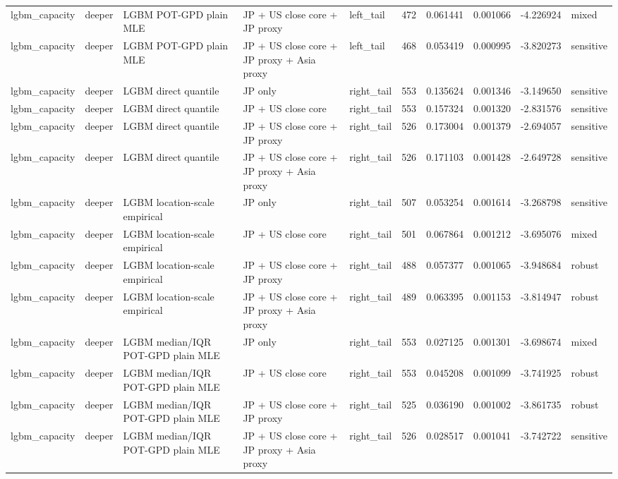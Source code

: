 \begin{tabular}{lll l lrrrrl}
lgbm\_capacity & deeper & LGBM POT-GPD plain MLE & JP + US close core + JP proxy & left\_tail & 472 & 0.061441 & 0.001066 & -4.226924 & mixed \\
lgbm\_capacity & deeper & LGBM POT-GPD plain MLE & JP + US close core + JP proxy + Asia proxy & left\_tail & 468 & 0.053419 & 0.000995 & -3.820273 & sensitive \\
lgbm\_capacity & deeper & LGBM direct quantile & JP only & right\_tail & 553 & 0.135624 & 0.001346 & -3.149650 & sensitive \\
lgbm\_capacity & deeper & LGBM direct quantile & JP + US close core & right\_tail & 553 & 0.157324 & 0.001320 & -2.831576 & sensitive \\
lgbm\_capacity & deeper & LGBM direct quantile & JP + US close core + JP proxy & right\_tail & 526 & 0.173004 & 0.001379 & -2.694057 & sensitive \\
lgbm\_capacity & deeper & LGBM direct quantile & JP + US close core + JP proxy + Asia proxy & right\_tail & 526 & 0.171103 & 0.001428 & -2.649728 & sensitive \\
lgbm\_capacity & deeper & LGBM location-scale empirical & JP only & right\_tail & 507 & 0.053254 & 0.001614 & -3.268798 & sensitive \\
lgbm\_capacity & deeper & LGBM location-scale empirical & JP + US close core & right\_tail & 501 & 0.067864 & 0.001212 & -3.695076 & mixed \\
lgbm\_capacity & deeper & LGBM location-scale empirical & JP + US close core + JP proxy & right\_tail & 488 & 0.057377 & 0.001065 & -3.948684 & robust \\
lgbm\_capacity & deeper & LGBM location-scale empirical & JP + US close core + JP proxy + Asia proxy & right\_tail & 489 & 0.063395 & 0.001153 & -3.814947 & robust \\
lgbm\_capacity & deeper & LGBM median/IQR POT-GPD plain MLE & JP only & right\_tail & 553 & 0.027125 & 0.001301 & -3.698674 & mixed \\
lgbm\_capacity & deeper & LGBM median/IQR POT-GPD plain MLE & JP + US close core & right\_tail & 553 & 0.045208 & 0.001099 & -3.741925 & robust \\
lgbm\_capacity & deeper & LGBM median/IQR POT-GPD plain MLE & JP + US close core + JP proxy & right\_tail & 525 & 0.036190 & 0.001002 & -3.861735 & robust \\
lgbm\_capacity & deeper & LGBM median/IQR POT-GPD plain MLE & JP + US close core + JP proxy + Asia proxy & right\_tail & 526 & 0.028517 & 0.001041 & -3.742722 & sensitive \\

\end{tabular}
